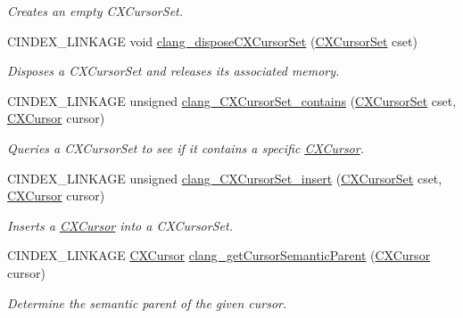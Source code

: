 \begin{DoxyCompactItemize}
\begin{DoxyCompactList}\small\item\em Creates an empty C\+X\+Cursor\+Set. \end{DoxyCompactList}\item 
\mbox{\label{group__CINDEX__CURSOR__MANIP_gaf4178bd9a28549b94c83863a973f5e05}} 
C\+I\+N\+D\+E\+X\+\_\+\+L\+I\+N\+K\+A\+GE void \mbox{\hyperlink{group__CINDEX__CURSOR__MANIP_gaf4178bd9a28549b94c83863a973f5e05}{clang\+\_\+dispose\+C\+X\+Cursor\+Set}} (\mbox{\hyperlink{group__CINDEX__CURSOR__MANIP_gacca741976831fc313f80970cbf88307d}{C\+X\+Cursor\+Set}} cset)
\begin{DoxyCompactList}\small\item\em Disposes a C\+X\+Cursor\+Set and releases its associated memory. \end{DoxyCompactList}\item 
C\+I\+N\+D\+E\+X\+\_\+\+L\+I\+N\+K\+A\+GE unsigned \mbox{\hyperlink{group__CINDEX__CURSOR__MANIP_ga518db5daf2ca251e4ff983d9f4f7d75d}{clang\+\_\+\+C\+X\+Cursor\+Set\+\_\+contains}} (\mbox{\hyperlink{group__CINDEX__CURSOR__MANIP_gacca741976831fc313f80970cbf88307d}{C\+X\+Cursor\+Set}} cset, \mbox{\hyperlink{structCXCursor}{C\+X\+Cursor}} cursor)
\begin{DoxyCompactList}\small\item\em Queries a C\+X\+Cursor\+Set to see if it contains a specific \mbox{\hyperlink{structCXCursor}{C\+X\+Cursor}}. \end{DoxyCompactList}\item 
C\+I\+N\+D\+E\+X\+\_\+\+L\+I\+N\+K\+A\+GE unsigned \mbox{\hyperlink{group__CINDEX__CURSOR__MANIP_ga172e5a92c77da9609ad80baf08751dd1}{clang\+\_\+\+C\+X\+Cursor\+Set\+\_\+insert}} (\mbox{\hyperlink{group__CINDEX__CURSOR__MANIP_gacca741976831fc313f80970cbf88307d}{C\+X\+Cursor\+Set}} cset, \mbox{\hyperlink{structCXCursor}{C\+X\+Cursor}} cursor)
\begin{DoxyCompactList}\small\item\em Inserts a \mbox{\hyperlink{structCXCursor}{C\+X\+Cursor}} into a C\+X\+Cursor\+Set. \end{DoxyCompactList}\item 
C\+I\+N\+D\+E\+X\+\_\+\+L\+I\+N\+K\+A\+GE \mbox{\hyperlink{structCXCursor}{C\+X\+Cursor}} \mbox{\hyperlink{group__CINDEX__CURSOR__MANIP_gabc327b200d46781cf30cb84d4af3c877}{clang\+\_\+get\+Cursor\+Semantic\+Parent}} (\mbox{\hyperlink{structCXCursor}{C\+X\+Cursor}} cursor)
\begin{DoxyCompactList}\small\item\em Determine the semantic parent of the given cursor. \end{DoxyCompactList}\item 

\end{DoxyCompactItemize}
